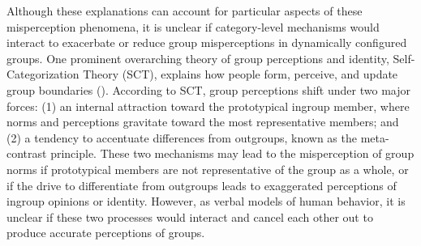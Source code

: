 Although these explanations can account for particular aspects of these misperception phenomena, it is unclear if category-level mechanisms would interact to exacerbate or reduce group misperceptions in dynamically configured groups. One prominent overarching theory of group perceptions and identity, Self-Categorization Theory (SCT), explains how people form, perceive, and update group boundaries (\cite{turner_rediscovering_1987}). According to SCT, group perceptions shift under two major forces: (1) an internal attraction toward the prototypical ingroup member, where norms and perceptions gravitate toward the most representative members; and (2) a tendency to accentuate differences from outgroups, known as the meta-contrast principle. 
These two mechanisms may lead to the misperception of group norms if prototypical members are not representative of the group as a whole, or if the drive to differentiate from outgroups leads to exaggerated perceptions of ingroup opinions or identity.
However, as verbal models of human behavior, it is unclear if these two processes would interact and cancel each other out to produce accurate perceptions of groups. 

